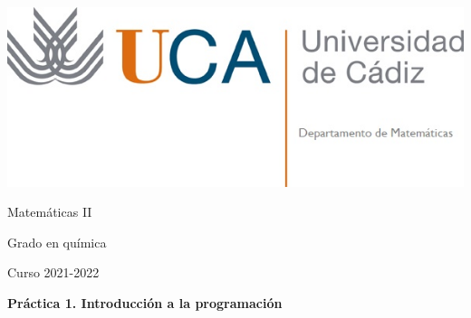 \documentclass{article}
\title{}
\author{}
\date{}
\begin{document}
\begin{minipage}{.4\textwidth}
	\includegraphics[width=\linewidth]{uca.jpg}
\end{minipage}
%
\begin{minipage}{.6\textwidth}
	\begin{flushright}
		{\Large Matemáticas II}

		\medskip
		{\large Grado en química}

		\medskip
		Curso 2021-2022
	\end{flushright}
\end{minipage}

\medskip
\textbf{\Large Práctica 1. Introducción a la programación}

%
%
%
%


\end{document}
